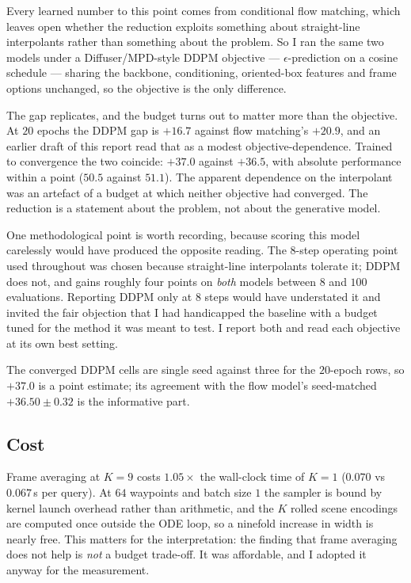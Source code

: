 \documentclass[11pt,a4paper]{article}
\begin{document}
Every learned number to this point comes from conditional flow matching, which
leaves open whether the reduction exploits something about straight-line
interpolants rather than something about the problem. So I ran the same two models
under a Diffuser/MPD-style DDPM objective --- $\epsilon$-prediction on a cosine
schedule --- sharing the backbone, conditioning, oriented-box features and frame
options unchanged, so the objective is the only difference.

The gap replicates, and the budget turns out to matter more than the objective.
At $20$ epochs the DDPM gap is $+16.7$ against flow matching's $+20.9$, and an
earlier draft of this report read that as a modest objective-dependence. Trained
to convergence the two coincide: $+37.0$ against $+36.5$, with absolute
performance within a point ($50.5$ against $51.1$). The apparent dependence on
the interpolant was an artefact of a budget at which neither objective had
converged. The reduction is a statement about the problem, not about the
generative model.

One methodological point is worth recording, because scoring this model carelessly
would have produced the opposite reading. The $8$-step operating point used
throughout was chosen because straight-line interpolants tolerate it; DDPM does
not, and gains roughly four points on \emph{both} models between $8$ and $100$
evaluations. Reporting DDPM only at $8$ steps would have understated it and
invited the fair objection that I had handicapped the baseline with a budget
tuned for the method it was meant to test. I report both and read each objective
at its own best setting.

The converged DDPM cells are single seed against three for the $20$-epoch rows,
so $+37.0$ is a point estimate; its agreement with the flow model's seed-matched
$+36.50 \pm 0.32$ is the informative part.

\subsection{Cost}
\label{sec:cost}

Frame averaging at $K=9$ costs $1.05\times$ the wall-clock time of $K=1$
($0.070$ vs $0.067$\,s per query). At $64$ waypoints and batch size $1$ the
sampler is bound by kernel launch overhead rather than arithmetic, and the $K$
rolled scene encodings are computed once outside the ODE loop, so a ninefold
increase in width is nearly free. This matters for the interpretation: the
finding that frame averaging does not help is \emph{not} a budget trade-off. It
was affordable, and I adopted it anyway for the measurement.
\end{document}
